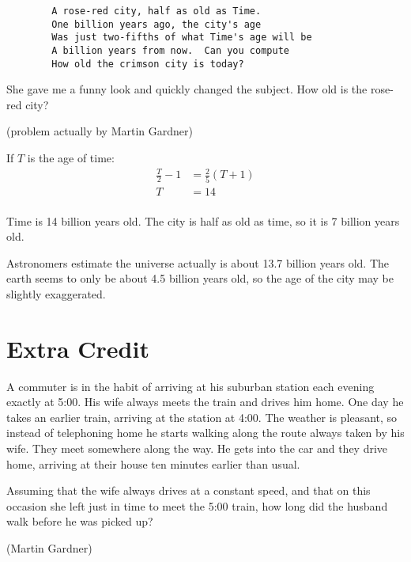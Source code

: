 \documentclass[letterpaper]{exam}
\begin{document}
\begin{questions}
      \begin{verbatim}
        A rose-red city, half as old as Time.
        One billion years ago, the city's age
        Was just two-fifths of what Time's age will be
        A billion years from now.  Can you compute
        How old the crimson city is today?
      \end{verbatim}

      She gave me a funny look and quickly changed the subject.  How old is the rose-red city?

      (problem actually by Martin Gardner)

      \begin{solution}
        If $T$ is the age of time:
        \begin{align*}
          \frac{T}{2} - 1 & = \frac{2}{5} (T + 1) \\
          T               & = 14 \\
        \end{align*}

        Time is 14 billion years old.  The city is half as old as time, so it is 7 billion years old.

        Astronomers estimate the universe actually is about 13.7 billion years old. The earth seems to only be
        about 4.5 billion years old, so the age of the city may be slightly exaggerated.

      \end{solution}
  \end{questions}

  \section{Extra Credit}

  A commuter is in the habit of arriving at his suburban station each evening exactly at 5:00.  His wife always meets
  the train and drives him home.  One day he takes an earlier train, arriving at the station at 4:00.  The weather is
  pleasant, so instead of telephoning home he starts walking along the route always taken by his wife.  They meet
  somewhere along the way.  He gets into the car and they drive home, arriving at their house ten minutes earlier than
  usual.  

  Assuming that the wife always drives at a constant speed, and that on this occasion she left just in time to meet
  the 5:00 train, how long did the husband walk before he was picked up?

  (Martin Gardner)
\end{document}
